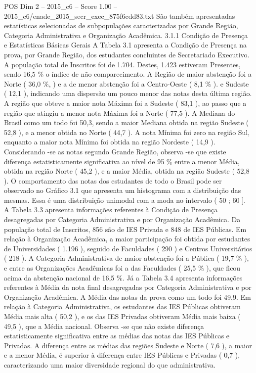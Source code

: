 \begin{textsample}{POS Dim 2 – 2015\_c6 – Score 1.00 – 2015\_c6/enade\_2015\_secr\_exec\_875f6cdd83.txt}
São também apresentadas estatísticas selecionadas de subpopulações caracterizadas por Grande Região, Categoria Administrativa e Organização Acadêmica. 3.1.1 Condição de Presença e Estatísticas Básicas Gerais A Tabela 3.1 apresenta a Condição de Presença na prova, por Grande Região, dos estudantes concluintes de Secretariado Executivo.
A população total de Inscritos foi de 1.704.
Destes, 1.423 estiveram Presentes, sendo 16,5 \% o índice de não comparecimento.
A Região de maior abstenção foi a Norte ( 36,0 \%, ) e a de menor abstenção foi a Centro-Oeste ( 8,1 \% ). e Sudeste ( 12,1 ), indicando uma dispersão um pouco menor das notas desta última região.
A região que obteve a maior nota Máxima foi a Sudeste ( 83,1 ), ao passo que a região que atingiu a menor nota Máxima foi a Norte ( 77,5 ).
A Mediana do Brasil como um todo foi 50,3, sendo a maior Mediana obtida na região Sudeste ( 52,8 ), e a menor obtida no Norte ( 44,7 ).
A nota Mínima foi zero na região Sul, enquanto a maior nota Mínima foi obtida na região Nordeste ( 14,9 ).
Considerando -se as notas segundo Grande Região, observa -se que existe diferença estatisticamente significativa ao nível de 95 \% entre a menor Média, obtida na região Norte ( 45,2 ), e a maior Média, obtida na região Sudeste ( 52,8 ).
O comportamento das notas dos estudantes de todo o Brasil pode ser observado no Gráfico 3.1 que apresenta um histograma com a distribuição das mesmas.
Essa é uma distribuição unimodal com a moda no intervalo ( 50 ; 60 ].
A Tabela 3.3 apresenta informações referentes à Condição de Presença desagregadas por Categoria Administrativa e por Organização Acadêmica.
Da população total de Inscritos, 856 são de IES Privada e 848 de IES Públicas.
Em relação à Organização Acadêmica, a maior participação foi obtida por estudantes de Universidades ( 1.196 ), seguido de Faculdades ( 290 ) e Centros Universitários ( 218 ).
A Categoria Administrativa de maior abstenção foi a Pública ( 19,7 \% ), e entre as Organizações Acadêmicas foi a das Faculdades ( 25,5 \% ), que ficou acima da abstenção nacional de 16,5 \%.
Já a Tabela 3.4 apresenta informações referentes à Média da nota final desagregadas por Categoria Administrativa e por Organização Acadêmica.
A Média das notas da prova como um todo foi 49,9.
Em relação à Categoria Administrativa, os estudantes das IES Públicas obtiveram Média mais alta ( 50,2 ), e os das IES Privadas obtiveram Média mais baixa ( 49,5 ), que a Média nacional.
Observa -se que não existe diferença estatisticamente significativa entre as médias das notas das IES Públicas e Privadas.
A diferença entre as médias das regiões Sudeste e Norte ( 7,6 ), a maior e a menor Média, é superior à diferença entre IES Públicas e Privadas ( 0,7 ), caracterizando uma maior diversidade regional do que administrativa.

\end{textsample}
